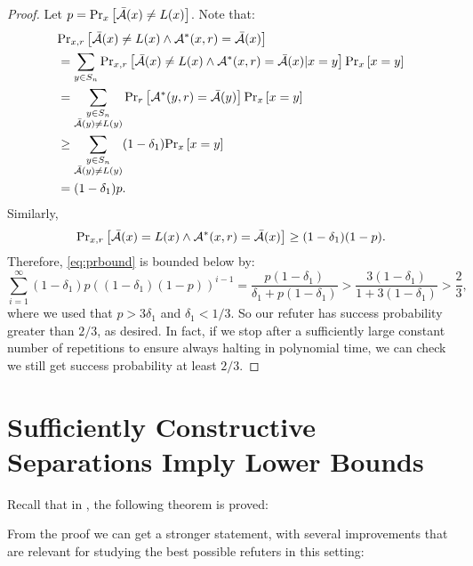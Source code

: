\begin{proof}
    Let $p = \text{Pr}_{x}\left[\bar{\mathcal{A}}(x) \neq L(x)\right]$. Note that:
    \begin{align*}
         & \text{Pr}_{x,r}\left[\bar{\mathcal{A}}(x) \neq L(x) \wedge \mathcal{A}^*(x, r) = \bar{\mathcal{A}}(x)\right] \\
         & = \sum_{y\in S_n} \text{Pr}_{x, r}\left[\bar{\mathcal{A}}(x) \neq L(x) \wedge \mathcal{A}^*(x, r) = \bar{\mathcal{A}}(x) | x = y\right] \text{Pr}_{x}\left[x = y\right] \\
         & = \sum_{\substack{y\in S_n \\ \bar{\mathcal{A}}(y) \neq L(y)}} \text{Pr}_{r}\left[\mathcal{A}^*(y, r) = \bar{\mathcal{A}}(y)\right] \text{Pr}_{x}\left[x = y\right] \\
         & \geq \sum_{\substack{y\in S_n \\ \bar{\mathcal{A}}(y) \neq L(y)}} (1-\delta_1) \text{Pr}_{x}\left[x = y\right] \\
         & = (1-\delta_1)p.
    \end{align*}
    Similarly, 
    $$
        \text{Pr}_{x,r}\left[\bar{\mathcal{A}}(x) = L(x) \wedge \mathcal{A}^*(x, r) = \bar{\mathcal{A}}(x)\right] \geq (1-\delta_1)(1-p).
    $$
    Therefore, \eqref{eq:prbound} is bounded below by:
    $$
        \sum_{i=1}^{\infty} (1-\delta_1)p ((1-\delta_1)(1-p))^{i-1} = \frac{p(1-\delta_1)}{\delta_1 + p(1-\delta_1)} > \frac{3(1-\delta_1)}{1+3(1-\delta_1)} > \frac{2}{3},
    $$
    where we used that $p > 3\delta_1$ and $\delta_1 < 1/3$. So our refuter has success probability greater than $2/3$, as desired. In fact, if we stop after a
    sufficiently large constant number of 
    repetitions to ensure always halting in polynomial time, we can check we still get success probability at least $2/3$. 





        
\end{proof}



\section{Sufficiently Constructive Separations Imply Lower Bounds}

Recall that in \cite{ConstructiveSeparations}, the following theorem is proved: 

\thmcsrefuterqa*

From the proof we can get a stronger statement, with several improvements that are 
relevant for studying the best possible refuters in this setting:

